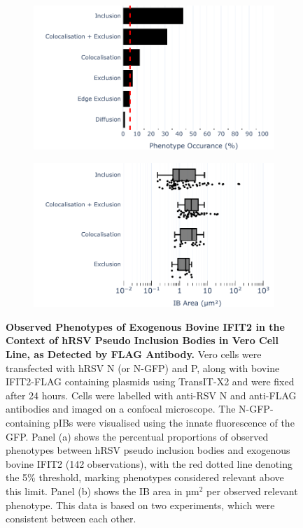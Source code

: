 \begin{figure}
    \begin{subfigure}{0.495\textwidth}
        \caption{}
        \includegraphics[width=1\linewidth]{09. Chapter 4/Figs/01. pIB/03. IFIT2/04. IFIT2-FLAG/03. FLAG/04. bar_bi2f_hnhp.pdf} 
    \end{subfigure}
    \begin{subfigure}{0.495\textwidth}
        \caption{}
        \includegraphics[width=1\linewidth]{09. Chapter 4/Figs/01. pIB/03. IFIT2/04. IFIT2-FLAG/03. FLAG/05. box_bi2f_hnhp.pdf}
    \end{subfigure}
    \caption[Observed Phenotypes of Exogenous Bovine IFIT2 in the Context of hRSV Pseudo Inclusion Bodies in Vero Cell Line, as Detected by FLAG Antibody.]{\textbf{Observed Phenotypes of Exogenous Bovine IFIT2 in the Context of hRSV Pseudo Inclusion Bodies in Vero Cell Line, as Detected by FLAG Antibody.} Vero cells were transfected with hRSV N (or N-GFP) and P, along with bovine IFIT2-FLAG containing plasmids using TransIT-X2 and were fixed after 24 hours. Cells were labelled with anti-RSV N and anti-FLAG antibodies and imaged on a confocal microscope. The N-GFP-containing pIBs were visualised using the innate fluorescence of the GFP. Panel (a) shows the percentual proportions of observed phenotypes between hRSV pseudo inclusion bodies and exogenous bovine IFIT2 (142 observations), with the red dotted line denoting the 5\% threshold, marking phenotypes considered relevant above this limit. Panel (b) shows the IB area in \(\mbox{µm}^2\) per observed relevant phenotype. This data is based on two experiments, which were consistent between each other.}

\end{figure}
